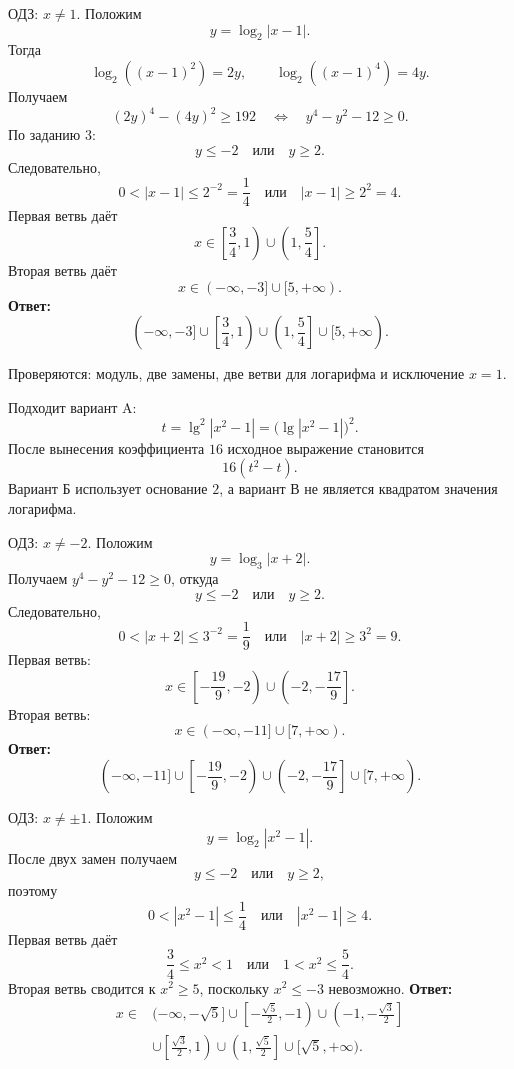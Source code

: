 \begin{teacheranswer}[Задание 5]
  ОДЗ: \(x\ne1\). Положим
  \[
    y=\log_2|x-1|.
  \]
  Тогда
  \[
    \log_2((x-1)^2)=2y,
    \qquad
    \log_2((x-1)^4)=4y.
  \]
  Получаем
  \[
    (2y)^4-(4y)^2\ge192
    \quad\Longleftrightarrow\quad
    y^4-y^2-12\ge0.
  \]
  По заданию 3:
  \[
    y\le-2\quad\text{или}\quad y\ge2.
  \]
  Следовательно,
  \[
    0<|x-1|\le2^{-2}=\frac14
    \quad\text{или}\quad
    |x-1|\ge2^2=4.
  \]
  Первая ветвь даёт
  \[
    x\in\left[\frac34,1\right)\cup\left(1,\frac54\right].
  \]
  Вторая ветвь даёт
  \[
    x\in(-\infty,-3]\cup[5,+\infty).
  \]
  \textbf{Ответ:}
  \[
    (-\infty,-3]
    \cup\left[\frac34,1\right)
    \cup\left(1,\frac54\right]
    \cup[5,+\infty).
  \]
\end{teacheranswer}

\begin{criterionbox}
  Проверяются: модуль, две замены, две ветви для логарифма и исключение \(x=1\).
\end{criterionbox}

\begin{teacheranswer}[Задание 6]
  Подходит вариант A:
  \[
    t=\lg^2|x^2-1|
    =\bigl(\lg|x^2-1|\bigr)^2.
  \]
  После вынесения коэффициента \(16\) исходное выражение становится
  \[
    16(t^2-t).
  \]
  Вариант Б использует основание \(2\), а вариант В не является квадратом
  значения логарифма.
\end{teacheranswer}

\begin{teacheranswer}[Задание 7]
  ОДЗ: \(x\ne-2\). Положим
  \[
    y=\log_3|x+2|.
  \]
  Получаем \(y^4-y^2-12\ge0\), откуда
  \[
    y\le-2\quad\text{или}\quad y\ge2.
  \]
  Следовательно,
  \[
    0<|x+2|\le3^{-2}=\frac19
    \quad\text{или}\quad
    |x+2|\ge3^2=9.
  \]
  Первая ветвь:
  \[
    x\in\left[-\frac{19}{9},-2\right)
    \cup\left(-2,-\frac{17}{9}\right].
  \]
  Вторая ветвь:
  \[
    x\in(-\infty,-11]\cup[7,+\infty).
  \]
  \textbf{Ответ:}
  \[
    (-\infty,-11]
    \cup\left[-\frac{19}{9},-2\right)
    \cup\left(-2,-\frac{17}{9}\right]
    \cup[7,+\infty).
  \]
\end{teacheranswer}

\begin{teacheranswer}[Задание 8]
  ОДЗ: \(x\ne\pm1\). Положим
  \[
    y=\log_2|x^2-1|.
  \]
  После двух замен получаем
  \[
    y\le-2\quad\text{или}\quad y\ge2,
  \]
  поэтому
  \[
    0<|x^2-1|\le\frac14
    \quad\text{или}\quad
    |x^2-1|\ge4.
  \]
  Первая ветвь даёт
  \[
    \frac34\le x^2<1
    \quad\text{или}\quad
    1<x^2\le\frac54.
  \]
  Вторая ветвь сводится к \(x^2\ge5\), поскольку \(x^2\le-3\) невозможно.
  \textbf{Ответ:}
  \[
    \begin{aligned}
      x\in{}&(-\infty,-\sqrt5]
      \cup\left[-\frac{\sqrt5}{2},-1\right)
      \cup\left(-1,-\frac{\sqrt3}{2}\right]\\
      &\cup\left[\frac{\sqrt3}{2},1\right)
      \cup\left(1,\frac{\sqrt5}{2}\right]
      \cup[\sqrt5,+\infty).
    \end{aligned}
  \]
\end{teacheranswer}

